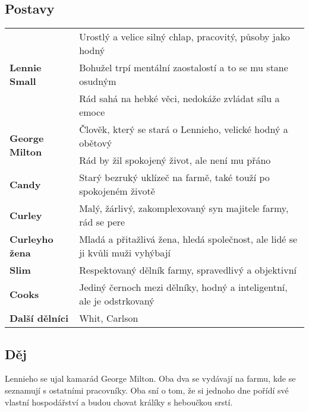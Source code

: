\subsection*{Postavy}
\begin{tabularx}{\linewidth}{l|l}
  \multirow{3}{15em}{\textbf{Lennie Small}}  & Urostlý a velice silný chlap, pracovitý, působy jako hodný                    \\
                                             & Bohužel trpí mentální zaostalostí a to se mu stane osudným                    \\
                                             & Rád sahá na hebké věci, nedokáže zvládat sílu a emoce                         \\
  \hline
  \multirow{2}{15em}{\textbf{George Milton}} & Člověk, který se stará o Lennieho, velické hodný a obětový                    \\
                                             & Rád by žil spokojený život, ale není mu přáno                                 \\
  \hline
  \textbf{Candy}                             & Starý bezruký uklízeč na farmě, také touží po spokojeném životě               \\
  \hline
  \textbf{Curley}                            & Malý, žárlivý, zakomplexovaný syn majitele farmy, rád se pere                 \\
  \hline
  \textbf{Curleyho žena}                     & Mladá a přitažlivá žena, hledá společnost, ale lidé se ji kvůli muži vyhýbají \\
  \hline
  \textbf{Slim}                              & Respektovaný dělník farmy, spravedlivý a objektivní                           \\
  \hline
  \textbf{Cooks}                             & Jediný černoch mezi dělníky, hodný a inteligentní, ale je odstrkovaný         \\
  \hline
  \textbf{Další dělníci}                     & Whit, Carlson                                                                 \\
\end{tabularx}
\subsection*{Děj}
Lennieho se ujal kamarád George Milton.
Oba dva se vydávají na farmu, kde se seznamují s ostatními pracovníky.
Oba sní o tom, že si jednoho dne pořídí své vlastní hospodářství a budou chovat králíky s heboučkou srstí.

